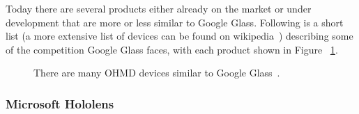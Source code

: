 Today there are several products either already on the market or under development that are more or less similar to Google Glass. Following is a short list (a more extensive list of devices can be found on wikipedia~\cite{ohmdWiki}) describing some of the competition Google Glass faces, with each product shown in Figure ~\ref{imagesSimilarProducts}. 

	\begin{figure}[ht!]
		\centering
    \qquad
    \qquad
    \qquad
    \qquad
		\caption{There are many OHMD devices similar to Google Glass~\cite{ohmdWiki}.}
		\label{imagesSimilarProducts}
	\end{figure}
	

\subsubsection{Microsoft Hololens~\cite{hololens}}

